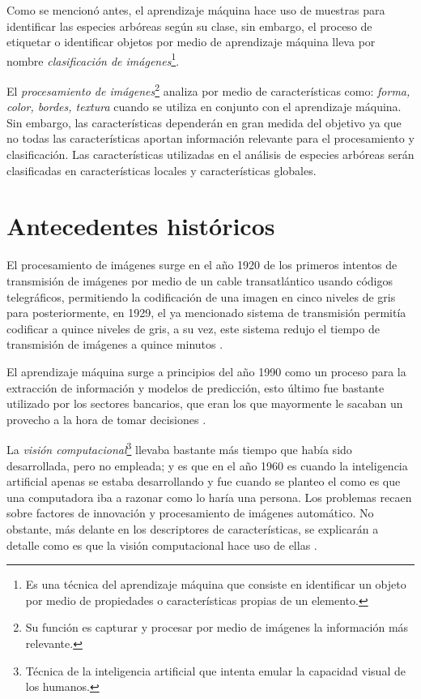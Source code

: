 Como se mencionó antes, el aprendizaje máquina hace uso de muestras para identificar las especies arbóreas según su clase, sin embargo, el proceso de etiquetar o identificar objetos por medio de aprendizaje máquina lleva por nombre \emph{clasificación de imágenes}\footnote{Es una técnica del aprendizaje máquina que consiste en identificar un objeto por medio de propiedades o características propias de un elemento.}.

El \emph{procesamiento de imágenes}\footnote{Su función es capturar y procesar por medio de imágenes la información más relevante.} analiza por medio de características como: \emph{forma, color, bordes, textura} cuando se utiliza en conjunto con el aprendizaje máquina. Sin embargo, las características dependerán en gran medida del objetivo ya que no todas las características aportan información relevante para el procesamiento y clasificación. Las características utilizadas en el análisis de especies arbóreas serán clasificadas en características locales y características globales.

\section{Antecedentes históricos}
El procesamiento de imágenes surge en el año 1920 de los primeros intentos de transmisión de imágenes por medio de un cable transatlántico usando códigos telegráficos, permitiendo la codificación de una imagen en cinco niveles de gris para posteriormente, en 1929, el ya mencionado sistema de transmisión permitía codificar a quince niveles de gris, a su vez, este sistema redujo el tiempo de transmisión de imágenes a quince minutos \cite{rf4}. 

El aprendizaje máquina surge a principios del año 1990 como un proceso para la extracción de información y modelos de predicción, esto último fue bastante utilizado por los sectores bancarios, que eran los que mayormente le sacaban un provecho a la hora de tomar decisiones \cite{rf5}. 

La \emph{visión computacional}\footnote{Técnica de la inteligencia artificial que intenta emular la capacidad visual de los humanos.} llevaba bastante más tiempo que había sido desarrollada, pero no empleada; y es que en el año 1960 es cuando la inteligencia artificial apenas se estaba desarrollando y fue cuando se planteo el como es que una computadora iba a razonar como lo haría una persona. Los problemas recaen sobre factores de innovación y procesamiento de imágenes automático. No obstante, más delante en los descriptores de características, se explicarán a detalle como es que la visión computacional hace uso de ellas \cite{rf6}.

